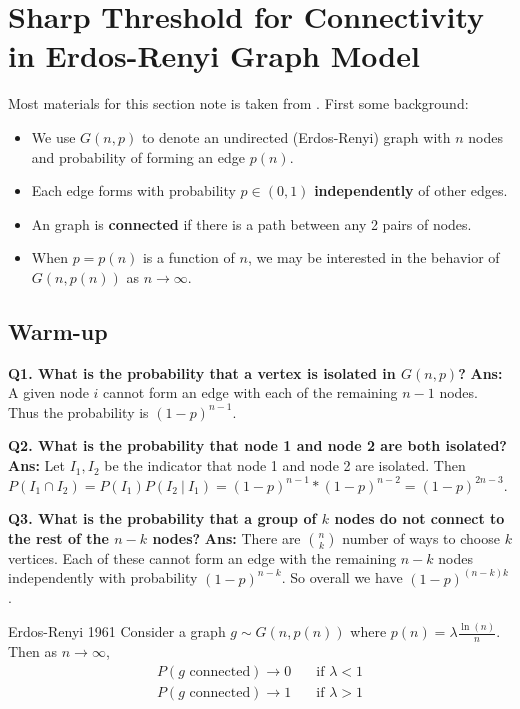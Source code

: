 \documentclass[./some_latex_template.tex]{subfiles}
\begin{document}
\section{Sharp Threshold for Connectivity in Erdos-Renyi Graph Model}

Most materials for this section note is taken from \cite{Acemoglu, Ramchandran}. First some background:

\begin{itemize}
	\item We use $G(n, p)$ to denote an undirected (Erdos-Renyi) graph with $n$ nodes and probability of forming an edge $p(n)$.
	\item Each edge forms with probability $p \in (0, 1)$ \textbf{independently} of other edges. 
	\item An graph is \textbf{connected} if there is a path between any 2 pairs of nodes. 
	\item When $p = p(n)$ is a function of $n$, we may be interested in the behavior of $G(n, p(n))$ as $n \rightarrow \infty$. 
\end{itemize}

\subsection{Warm-up}

\textbf{Q1. What is the probability that a vertex is isolated in $G(n, p)$?} \textbf{Ans:} A given node $i$ cannot form an edge with each of the remaining $n - 1$ nodes. Thus the probability is $(1 - p)^{n-1}$. 

\noindent \textbf{Q2. What is the probability that node 1 and node 2 are both isolated?} \textbf{Ans:} Let $I_1, I_2$ be the indicator that node 1 and node 2 are isolated. Then $P(I_1 \cap I_2) = P(I_1)P(I_2 \ | \ I_1)  = (1-p)^{n-1} * (1 - p)^{n - 2} = (1 - p)^{2n-3}$. 

\noindent \textbf{Q3. What is the probability that a group of $k$ nodes do not connect to the rest of the $n-k$ nodes?} \textbf{Ans:} There are ${n \choose k}$ number of ways to choose $k$ vertices. Each of these cannot form an edge with the remaining $n-k$ nodes independently with probability $(1-p)^{n-k}$. So overall we have $(1-p)^{(n-k)k}$. \\

\begin{theorembox}{Erdos-Renyi 1961}{}
Consider a graph $g \sim G(n, p(n))$ where $p(n) = \lambda \frac{\ln(n)}{n}$. Then as $n \rightarrow \infty$,
\begin{align*}
	P(g \text{ connected}) \rightarrow 0 & \quad \text{if } \lambda < 1\\
	P(g \text{ connected}) \rightarrow 1 & \quad \text{if } \lambda > 1
\end{align*}
\end{theorembox}
\end{document}
